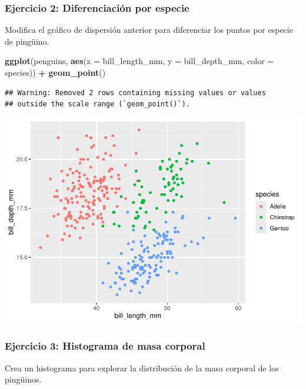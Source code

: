 \documentclass[
]{book}
\newenvironment{Shaded}{\begin{snugshade}}{\end{snugshade}}
\newcommand{\AttributeTok}[1]{\textcolor[rgb]{0.13,0.29,0.53}{#1}}
\newcommand{\FunctionTok}[1]{\textcolor[rgb]{0.13,0.29,0.53}{\textbf{#1}}}
\newcommand{\NormalTok}[1]{#1}
\newcommand{\SpecialCharTok}[1]{\textcolor[rgb]{0.81,0.36,0.00}{\textbf{#1}}}
\begin{document}
\subsubsection{Ejercicio 2: Diferenciación por especie}\label{ejercicio-2-diferenciaciuxf3n-por-especie}

Modifica el gráfico de dispersión anterior para diferenciar los puntos por especie de pingüino.

\begin{Shaded}
\begin{Highlighting}[]
\FunctionTok{ggplot}\NormalTok{(penguins, }\FunctionTok{aes}\NormalTok{(}\AttributeTok{x =}\NormalTok{ bill\_length\_mm, }\AttributeTok{y =}\NormalTok{ bill\_depth\_mm, }\AttributeTok{color =}\NormalTok{ species)) }\SpecialCharTok{+}
  \FunctionTok{geom\_point}\NormalTok{()}
\end{Highlighting}
\end{Shaded}

\begin{verbatim}
## Warning: Removed 2 rows containing missing values or values
## outside the scale range (`geom_point()`).
\end{verbatim}

\includegraphics{bookdown-demo_files/figure-latex/unnamed-chunk-184-1.pdf}

\subsubsection{Ejercicio 3: Histograma de masa corporal}\label{ejercicio-3-histograma-de-masa-corporal}

Crea un histograma para explorar la distribución de la masa corporal de los pingüinos.
\end{document}
